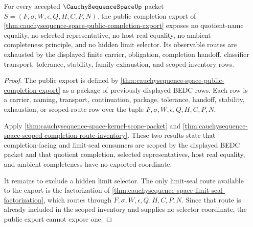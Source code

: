 \begin{theorem}
\label{thm:cauchysequence-space-public-nonescape}
For every accepted $\CauchySequenceSpaceUp$ packet $S=(F,\sigma,W,\epsilon,Q,H,C,P,N)$, the public completion export of \autoref{thm:cauchysequence-space-public-completion-export} exposes no quotient-name equality, no selected representative, no host real equality, no ambient completeness principle, and no hidden limit selector. Its observable routes are exhausted by the displayed finite carrier, obligation, completion handoff, classifier transport, tolerance, stability, family-exhaustion, and scoped-inventory rows.
\end{theorem}
\begin{proof}
The public export is defined by \autoref{thm:cauchysequence-space-public-completion-export} as a package of previously displayed BEDC rows. Each row is a carrier, naming, transport, continuation, package, tolerance, handoff, stability, exhaustion, or scoped-route row over the tuple $F,\sigma,W,\epsilon,Q,H,C,P,N$.

Apply \autoref{thm:cauchysequence-space-kernel-scope-packet} and \autoref{thm:cauchysequence-space-scoped-completion-route-inventory}. These two results state that completion-facing and limit-seal consumers are scoped by the displayed BEDC packet and that quotient completion, selected representatives, host real equality, and ambient completeness have no exported coordinate.

It remains to exclude a hidden limit selector. The only limit-seal route available to the export is the factorization of \autoref{thm:cauchysequence-space-limit-seal-factorization}, which routes through $F,\sigma,W,\epsilon,Q,H,C,P,N$. Since that route is already included in the scoped inventory and supplies no selector coordinate, the public export cannot expose one.
\end{proof}

